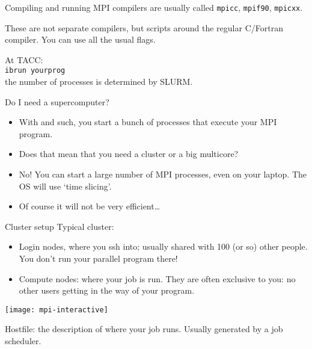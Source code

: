 
\begin{frame}[containsverbatim]{Compiling and running}
  MPI compilers are usually called \texttt{mpicc},
  \texttt{mpif90}, \texttt{mpicxx}.

  These are not separate compilers,
  but scripts around the regular C/Fortran compiler. You can use all
  the usual flags.

  At TACC:\\
  \verb+ibrun yourprog+\\
  the number of processes is determined by SLURM.
\end{frame}

\begin{frame}[containsverbatim]{Do I need a supercomputer?}
  \begin{itemize}
  \item With  and such, you start a bunch of processes that
    execute your MPI program.
  \item Does that mean that you need a cluster or a big multicore?
  \item No! You can start a large number of MPI processes, even on
    your laptop. The OS will use `time slicing'.
  \item Of course it will not be very efficient\ldots
  \end{itemize}
\end{frame}

\begin{frame}{Cluster setup}
  \small
  Typical cluster:
  \begin{itemize}
  \item Login nodes, where you ssh into; usually shared with 100 (or
    so) other people. You don't run your parallel program there!
  \item Compute nodes: where your job is run. They are often exclusive
    to you: no other users getting in the way of your program.
  \end{itemize}
  \texttt{[image: mpi-interactive]}

  Hostfile: the description of where your job runs. Usually generated
  by a job scheduler.
\end{frame}

